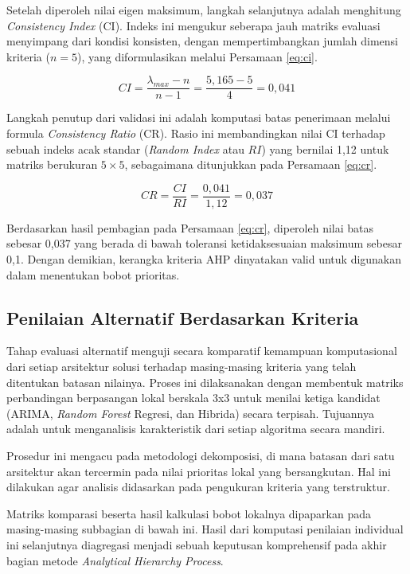 Setelah diperoleh nilai eigen maksimum, langkah selanjutnya adalah menghitung \textit{Consistency Index} (CI). Indeks ini mengukur seberapa jauh matriks evaluasi menyimpang dari kondisi konsisten, dengan mempertimbangkan jumlah dimensi kriteria ($n=5$), yang diformulasikan melalui Persamaan \ref{eq:ci}.

\newpage

\begin{equation}
    CI = \frac{\lambda_{max} - n}{n - 1} = \frac{5,165 - 5}{4} = 0,041
    \label{eq:ci}
\end{equation}

Langkah penutup dari validasi ini adalah komputasi batas penerimaan melalui formula \textit{Consistency Ratio} (CR). Rasio ini membandingkan nilai CI terhadap sebuah indeks acak standar (\textit{Random Index} atau $RI$) yang bernilai 1,12 untuk matriks berukuran $5 \times 5$, sebagaimana ditunjukkan pada Persamaan \ref{eq:cr}.

\begin{equation}
    CR = \frac{CI}{RI} = \frac{0,041}{1,12} = 0,037
    \label{eq:cr}
\end{equation}

Berdasarkan hasil pembagian pada Persamaan \ref{eq:cr}, diperoleh nilai batas sebesar 0,037 yang berada di bawah toleransi ketidaksesuaian maksimum sebesar 0,1. Dengan demikian, kerangka kriteria AHP dinyatakan valid untuk digunakan dalam menentukan bobot prioritas.

\subsection{Penilaian Alternatif Berdasarkan Kriteria}

Tahap evaluasi alternatif menguji secara komparatif kemampuan komputasional dari setiap arsitektur solusi terhadap masing-masing kriteria yang telah ditentukan batasan nilainya. Proses ini dilaksanakan dengan membentuk matriks perbandingan berpasangan lokal berskala 3x3 untuk menilai ketiga kandidat (ARIMA, \textit{Random Forest} Regresi, dan Hibrida) secara terpisah. Tujuannya adalah untuk menganalisis karakteristik dari setiap algoritma secara mandiri.

Prosedur ini mengacu pada metodologi dekomposisi, di mana batasan dari satu arsitektur akan tercermin pada nilai prioritas lokal yang bersangkutan. Hal ini dilakukan agar analisis didasarkan pada pengukuran kriteria yang terstruktur.

Matriks komparasi beserta hasil kalkulasi bobot lokalnya dipaparkan pada masing-masing subbagian di bawah ini. Hasil dari komputasi penilaian individual ini selanjutnya diagregasi menjadi sebuah keputusan komprehensif pada akhir bagian metode \textit{Analytical Hierarchy Process}.

